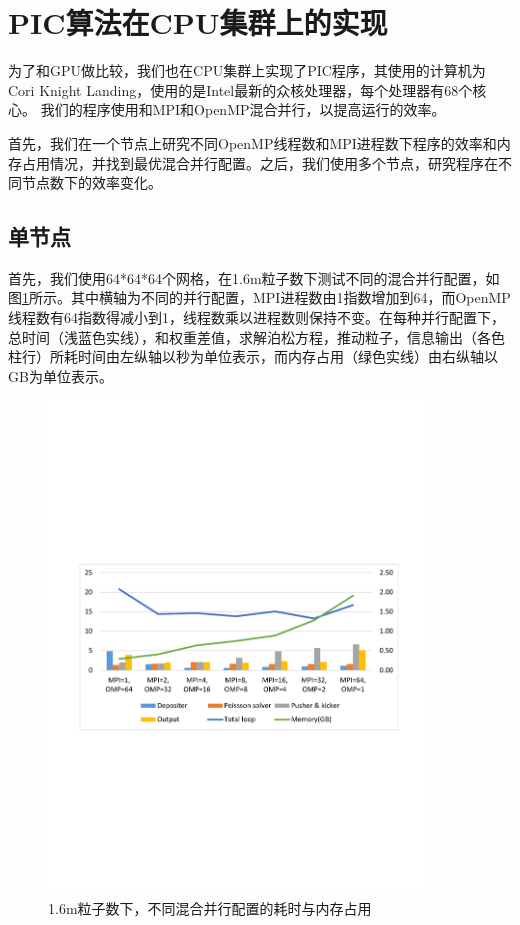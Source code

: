 \section{PIC算法在CPU集群上的实现}        \label{section:PIC_CPUcluster}
为了和GPU做比较，我们也在CPU集群上实现了PIC程序，其使用的计算机为Cori Knight Landing，使用的是Intel最新的众核处理器，每个处理器有68个核心。
我们的程序使用和MPI和OpenMP混合并行，以提高运行的效率。

首先，我们在一个节点上研究不同OpenMP线程数和MPI进程数下程序的效率和内存占用情况，并找到最优混合并行配置。之后，我们使用多个节点，研究程序在不同节点数下的效率变化。

\subsection{单节点}
首先，我们使用64*64*64个网格，在1.6m粒子数下测试不同的混合并行配置，如图\ref{fig:PIC_speedup_Cori_1node_1_6m}所示。其中横轴为不同的并行配置，MPI进程数由1指数增加到64，而OpenMP线程数有64指数得减小到1，线程数乘以进程数则保持不变。在每种并行配置下，总时间（浅蓝色实线），和权重差值，求解泊松方程，推动粒子，信息输出（各色柱行）所耗时间由左纵轴以秒为单位表示，而内存占用（绿色实线）由右纵轴以GB为单位表示。

\begin{figure}[!htb]
  \centering
  \includegraphics[width=0.9\textwidth]{Img/PIC_speedup_Cori_1node_1_6m.pdf}
  \caption{1.6m粒子数下，不同混合并行配置的耗时与内存占用}
  \label{fig:PIC_speedup_Cori_1node_1_6m}
\end{figure}

